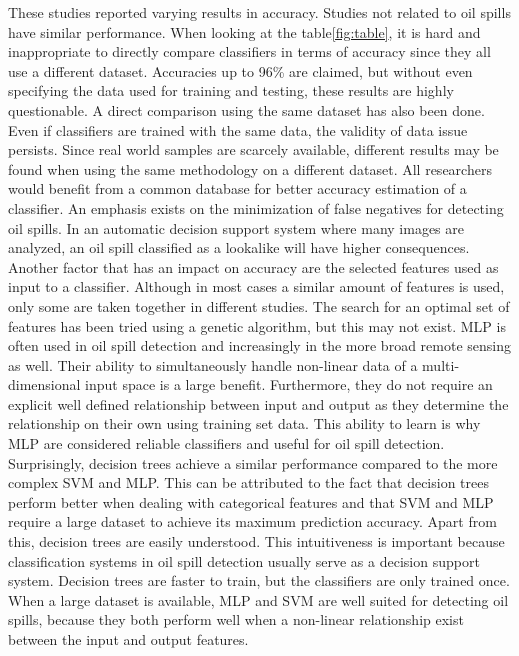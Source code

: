 These studies reported varying results in accuracy. Studies not related to oil spills have similar performance. When looking at the table\ref{fig:table}, it is hard and inappropriate to directly compare classifiers in terms of accuracy since they all use a different dataset. Accuracies up to 96\% are claimed\cite{Topouzelis200924}, but without even specifying the data used for training and testing, these results are highly questionable. A direct comparison using the same dataset has also been done\cite{Mera201472}\cite{Xu201414}. Even if classifiers are trained with the same data, the validity of data issue persists. Since real world samples are scarcely available, different results may be found when using the same methodology on a different dataset. All researchers would benefit from a common database for better accuracy estimation of a classifier\cite{Topouzelis200810}. An emphasis exists on the minimization of false negatives for detecting oil spills. In an automatic decision support system where many images are analyzed, an oil spill classified as a lookalike will have higher consequences. Another factor that has an impact on accuracy are the selected features used as input to a classifier. Although in most cases a similar amount of features is used, only some are taken together in different studies. The search for an optimal set of features has been tried using a genetic algorithm\cite{Topouzelis200930}, but this may not exist.
MLP is often used in oil spill detection and increasingly in the more broad remote sensing as well. Their ability to simultaneously handle non-linear data of a multi-dimensional input space is a large benefit. Furthermore, they do not require an explicit well defined relationship between input and output as they determine the relationship on their own using training set data. This ability to learn is why MLP are considered reliable classifiers and useful for oil spill detection\cite{Delfrate200038}. Surprisingly, decision trees achieve a similar performance compared to the more complex SVM and MLP. This can be attributed to the fact that decision trees perform better when dealing with categorical features and that SVM and MLP require a large dataset to achieve its maximum prediction accuracy\cite{kotsiantis2007supervised}. Apart from this, decision trees are easily understood. This intuitiveness is important because classification systems in oil spill detection usually serve as a decision support system. Decision trees are faster to train, but the classifiers are only trained once. When a large dataset is available, MLP and SVM are well suited for detecting oil spills, because they both perform well when a non-linear relationship exist between the input and output features\cite{kotsiantis2007supervised}.
